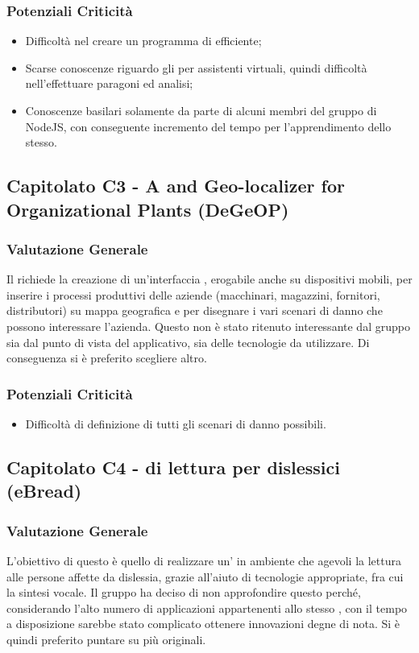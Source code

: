      \subsubsection{Potenziali Criticità}
      \begin{itemize}
       \item Difficoltà nel creare un programma di  efficiente;
       \item Scarse conoscenze riguardo gli  per assistenti virtuali, quindi difficoltà nell'effettuare paragoni ed analisi;
       \item Conoscenze basilari solamente da parte di alcuni membri del gruppo di NodeJS, con conseguente incremento del tempo per l'apprendimento dello stesso.
      \end{itemize}
  \subsection{Capitolato C3 - A  and Geo-localizer  for Organizational Plants (DeGeOP)}
    \subsubsection{Valutazione Generale}
    Il  richiede la creazione di un'interfaccia , erogabile anche su dispositivi mobili, per inserire i processi produttivi delle aziende (macchinari, magazzini, fornitori, distributori) su mappa geografica e per disegnare i vari scenari di danno che possono interessare l'azienda. 
    Questo  non è stato ritenuto interessante dal gruppo sia dal punto di vista del  applicativo, sia delle tecnologie da utilizzare. Di conseguenza si è preferito scegliere altro.
    \subsubsection{Potenziali Criticità}
    \begin{itemize}
     \item Difficoltà di definizione di tutti gli scenari di danno possibili.
    \end{itemize}
\subsection{Capitolato C4 -  di lettura per dislessici (eBread)}
    \subsubsection{Valutazione Generale}
    L'obiettivo di questo  è quello di realizzare un' in ambiente  che agevoli la lettura alle persone affette da dislessia, grazie all'aiuto di tecnologie appropriate, fra cui la sintesi vocale.
Il gruppo ha deciso di non approfondire questo  perché, considerando l'alto numero di applicazioni appartenenti allo stesso , con il tempo a disposizione sarebbe stato complicato ottenere innovazioni degne di nota. Si è quindi preferito puntare su  più originali.
